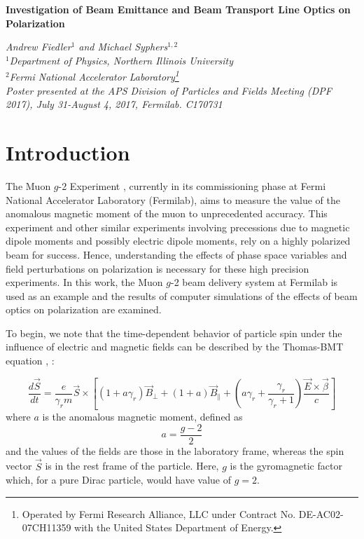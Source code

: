 \documentclass[12pt]{article}
\def\Title#1{\begin{center} {\Large {\bf #1} } \end{center}}
\begin{document}
\renewcommand{\thefootnote}{\fnsymbol{footnote}}

\Title{Investigation of Beam Emittance and Beam Transport Line Optics on Polarization}

\bigskip\bigskip


\begin{raggedright}  

{\it Andrew Fiedler$^{1}$ and Michael Syphers$^{1,2}$ \\
$^{1}$Department of Physics, 
Northern Illinois University\\
 $^{2}$Fermi National Accelerator Laboratory\footnote[1]{Operated by Fermi Research Alliance, LLC under Contract No. DE-AC02-07CH11359 with the United States Department of Energy.
} \\
Poster presented at the APS Division of Particles and Fields Meeting (DPF 2017), July 31-August 4, 2017, Fermilab. C170731}
\bigskip\bigskip
\end{raggedright}



\section{Introduction}
The Muon $g$-2 Experiment \cite{TDR}, currently in its commissioning phase at Fermi National Accelerator Laboratory (Fermilab), aims to measure the value of the anomalous magnetic moment of the muon to unprecedented accuracy.   This experiment and other similar experiments involving precessions due to magnetic dipole moments and possibly electric dipole moments, rely on a highly polarized beam for success.  Hence, understanding the effects of phase space variables and field perturbations on polarization is necessary for these high precision experiments. In this work, the Muon $g$-2 beam delivery system at Fermilab is used as an example and the results of computer simulations of the effects of beam optics on polarization are examined.

To begin, we note that the time-dependent behavior of particle spin under the influence of electric and magnetic fields can be described by the Thomas-BMT equation \cite{Thomas}, \cite{BMT}: 

\begin{equation}
\frac{d \vec{S}}{dt} = \frac{e}{\gamma_r m} \vec{S} \times \left[ (1 + a \gamma_r) \vec{B}_{\perp} + (1 + a) \vec{B}_{\parallel} + \left(a \gamma_r + \frac{\gamma_r}{\gamma_r + 1} \right) \frac{\vec{E} \times \vec{\beta}}{c} \right]
\label{eq:ThomasBMT}
\end{equation}
where $a$ is the anomalous magnetic moment, defined as
\begin{equation}
a = \frac{g-2}{2}
\end{equation}
and the values of the fields are those in the laboratory frame, whereas the spin vector $\vec{S}$ is in the rest frame of the particle.  Here, $g$ is the gyromagnetic factor which, for a pure Dirac particle, would have value of $g=2$.
\end{document}
